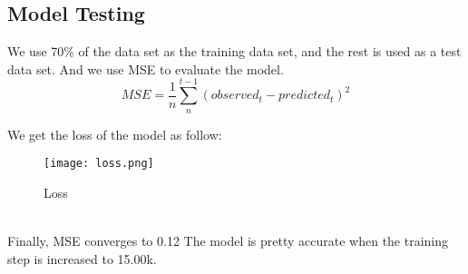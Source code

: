 \documentclass{mcmthesis}
\begin{document}
\subsection{Model Testing}
We use 70\% of the data set as the training data set, and the rest is used as a test data set. And we use MSE to evaluate the model.
\[MSE=\frac{1}{n}\sum_{n}^{t-1}\left ( observed_{t} -predicted_{t}\right)^{2}\]

We get the loss of the model as follow:\\
\begin{figure}[h]
\small
\centering
\texttt{[image: loss.png]}
\caption{Loss} 
\label{fig:lf}
\end{figure}\\

Finally, MSE converges to 0.12
The model is pretty accurate when the training step is increased to 15.00k.
\end{document}
